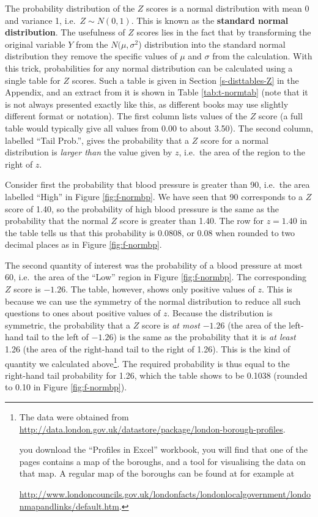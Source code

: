 \documentclass[11pt,a4paper,openany]{book}
\let\rmarkdownfootnote\footnote%
\def\footnote{\protect\rmarkdownfootnote}
\begin{document}
The probability distribution of the \(Z\) scores is a normal
distribution with mean 0 and variance 1, i.e.~\(Z\sim N(0,1)\). This is
known as the \textbf{standard normal distribution}. The usefulness of
\(Z\) scores lies in the fact that by transforming the original variable
\(Y\) from the \(N(\mu, \sigma^{2}\)) distribution into the standard
normal distribution they remove the specific values of \(\mu\) and
\(\sigma\) from the calculation. With this trick, probabilities for any
normal distribution can be calculated using a single table for \(Z\)
scores. Such a table is given in Section \ref{s-disttables-Z} in the
Appendix, and an extract from it is shown in Table \ref{tab:t-normtab}
(note that it is not always presented exactly like this, as different
books may use slightly different format or notation). The first column
lists values of the \(Z\) score (a full table would typically give all
values from 0.00 to about 3.50). The second column, labelled ``Tail
Prob.'', gives the probability that a \(Z\) score for a normal
distribution is \emph{larger than} the value given by \(z\), i.e.~the
area of the region to the right of \(z\).

Consider first the probability that blood pressure is greater than 90,
i.e.~the area labelled ``High'' in Figure \ref{fig:f-normbp}. We have
seen that 90 corresponds to a \(Z\) score of 1.40, so the probability of
high blood pressure is the same as the probability that the normal \(Z\)
score is greater than 1.40. The row for \(z=1.40\) in the table tells us
that this probability is 0.0808, or 0.08 when rounded to two decimal
places as in Figure \ref{fig:f-normbp}.

The second quantity of interest was the probability of a blood pressure
at most 60, i.e.~the area of the ``Low'' region in Figure
\ref{fig:f-normbp}. The corresponding \(Z\) score is \(-1.26\). The
table, however, shows only positive values of \(z\). This is because we
can use the symmetry of the normal distribution to reduce all such
questions to ones about positive values of \(z\). Because the
distribution is symmetric, the probability that a \(Z\) score is
\emph{at most} \(-1.26\) (the area of the left-hand tail to the left of
\(-1.26\)) is the same as the probability that it is \emph{at least}
1.26 (the area of the right-hand tail to the right of 1.26). This is the
kind of quantity we calculated above\footnote{The data were obtained
  from
  \url{http://data.london.gov.uk/datastore/package/london-borough-profiles}.

  \noindentIf you download the ``Profiles in Excel'' workbook, you will
  find that one of the pages contains a map of the boroughs, and a tool
  for visualising the data on that map. A regular map of the boroughs
  can be found at for example at

  \url{http://www.londoncouncils.gov.uk/londonfacts/londonlocalgovernment/londonmapandlinks/default.htm}.}.
The required probability is thus equal to the right-hand tail
probability for 1.26, which the table shows to be 0.1038 (rounded to
0.10 in Figure \ref{fig:f-normbp}).
\end{document}
